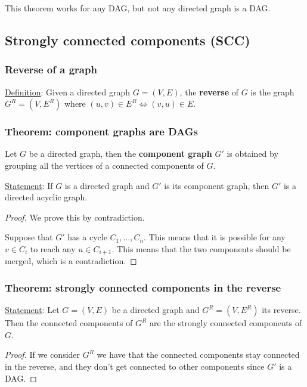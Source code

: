 \documentclass[10pt]{extarticle}
\begin{document}
This theorem works for any DAG, but not any directed graph is a DAG.

\subsection{Strongly connected components (SCC)}

\subsubsection{Reverse of a graph}

\underline{Definition}: Given a directed graph $G=(V, E)$,
the \textbf{reverse} of $G$ is the graph $G^R = (V, E^R)$ where $(u, v) \in E^R \iff (v,u) \in E$.

\subsubsection{Theorem: component graphs are DAGs}

Let $G$ be a directed graph, then the \textbf{component graph} $G'$ is obtained by grouping all the vertices of a connected components of $G$.

\underline{Statement}: If $G$ is a directed graph and $G'$ is its component graph, then $G'$ is a directed acyclic graph.

\begin{proof}
    We prove this by contradiction.

    Suppose that $G'$ has a cycle $C_1, \ldots, C_n$.
    This means that it is possible for any $v \in C_i$ to reach any $u \in C_{i+1}$.
    This means that the two components should be merged, which is a contradiction.
\end{proof}

\subsubsection{Theorem: strongly connected components in the reverse}

\underline{Statement}: Let $G = (V, E)$ be a directed graph and $G^R = (V, E^R)$ its reverse.
Then the connected components of $G^R$ are the strongly connected components of $G$.

\begin{proof}
    If we consider $G^R$ we have that the connected components stay connected in the reverse, and they don't get connected to other components since $G'$ is a DAG.

\end{proof}
\end{document}
